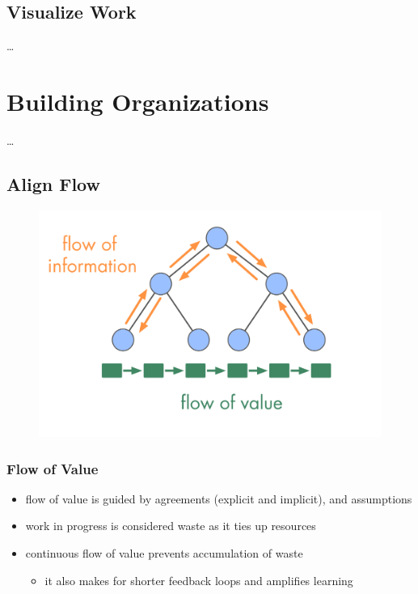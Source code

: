 \section{Visualize Work}
\label{visualizework}

{\ldots}

\chapter{Building Organizations}
\label{buildingorganizations}

{\ldots}

\section{Align Flow}
\label{alignflow}

\begin{figure}[htbp]
\centering
\includegraphics[keepaspectratio,width=\textwidth,height=0.75\textheight]{img/evolution/types-of-flow.png}
\end{figure}

\subsection{Flow of Value}
\label{flowofvalue}

\begin{itemize}
\item flow of value is guided by agreements (explicit and implicit), and assumptions

\item work in progress is considered waste as it ties up resources

\item continuous flow of value prevents accumulation of waste

\begin{itemize}
\item it also makes for shorter feedback loops and amplifies learning

\end{itemize}

\end{itemize}

